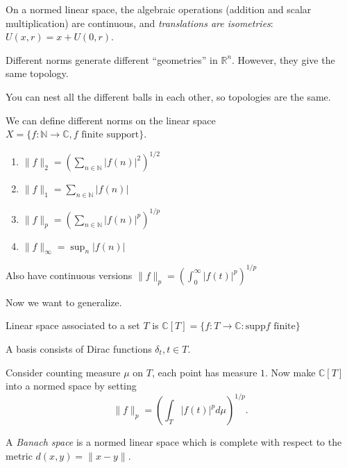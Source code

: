 
On a normed linear space, the algebraic operations (addition and scalar multiplication) are continuous, and \textit{translations are isometries}: $U(x, r) = x + U(0, r)$.

\begin{remark}
	Different norms generate different ``geometries'' in $\mathbb{R}^n$.  However, they give the same topology.

	You can nest all the different balls in each other, so topologies are the same.
\end{remark}

\begin{example}
	 We can define different norms on the linear space $X = \{f: \mathbb{N} \to  \mathbb{C}, f \text{ finite support}\} $.
	 \begin{enumerate}
	 	\item $\|f\|_2 = \left( \sum_{n \in \mathbb{N}} |f(n)|^2 \right) ^{1 / 2}$
		\item $\| f\|_1 = \sum_{n \in \mathbb{N}} |f(n)|$
		\item $\| f\|_p = \left( \sum _{n \in \mathbb{N}} |f(n)|^p \right) ^{1 / p}$
		\item $\| f\|_{\infty } = \sup _n |f(n)|$
	 \end{enumerate}
	 Also have continuous versions $\|f\|_p = \left( \int _0^\infty  |f(t)|^p \right) ^{1 / p}$
\end{example}

Now we want to generalize. 

\begin{definition}
	\label{defn:LinearSpaceAssociatedToASet}
	Linear space associated to a set $T$ is $\mathbb{C} [ T] = \{f: T \to \mathbb{C}: \text{supp} f \text{ finite}\} $
	
	A basis consists of Dirac functions  $\delta_t, t \in T$.

	Consider counting measure $\mu$ on $T$, each point has measure $1$. Now make $\mathbb{C}[T]$ into a normed space by setting
	\[
		\|f\|_p = \left( \int _T |f(t)|^p d \mu \right) ^{1 / p} 
	.\] 
\end{definition}

\begin{definition}
	\label{defn:BanachSpace}
	A \textit{Banach space} is a normed linear space which is complete with respect to the metric $d(x, y) = \|x - y\|$.
\end{definition}


